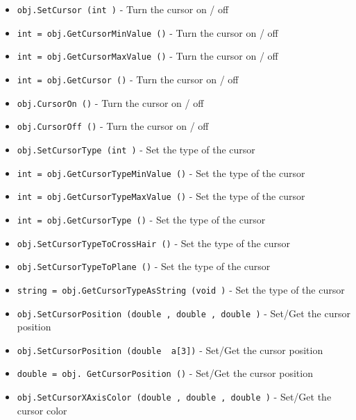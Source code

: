 \begin{itemize}
\item  \verb|obj.SetCursor (int )| -  Turn the cursor on / off

\item  \verb|int = obj.GetCursorMinValue ()| -  Turn the cursor on / off

\item  \verb|int = obj.GetCursorMaxValue ()| -  Turn the cursor on / off

\item  \verb|int = obj.GetCursor ()| -  Turn the cursor on / off

\item  \verb|obj.CursorOn ()| -  Turn the cursor on / off

\item  \verb|obj.CursorOff ()| -  Turn the cursor on / off

\item  \verb|obj.SetCursorType (int )| -  Set the type of the cursor

\item  \verb|int = obj.GetCursorTypeMinValue ()| -  Set the type of the cursor

\item  \verb|int = obj.GetCursorTypeMaxValue ()| -  Set the type of the cursor

\item  \verb|int = obj.GetCursorType ()| -  Set the type of the cursor

\item  \verb|obj.SetCursorTypeToCrossHair ()| -  Set the type of the cursor

\item  \verb|obj.SetCursorTypeToPlane ()| -  Set the type of the cursor

\item  \verb|string = obj.GetCursorTypeAsString (void )| -  Set the type of the cursor

\item  \verb|obj.SetCursorPosition (double , double , double )| -  Set/Get the cursor position

\item  \verb|obj.SetCursorPosition (double  a[3])| -  Set/Get the cursor position

\item  \verb|double = obj. GetCursorPosition ()| -  Set/Get the cursor position

\item  \verb|obj.SetCursorXAxisColor (double , double , double )| -  Set/Get the cursor color


\end{itemize}
